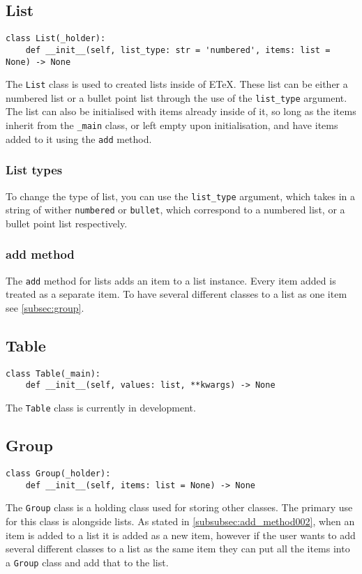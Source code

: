 \documentclass{article}
\begin{document}
\subsection{List}\label{subsec:list}
\begin{verbatim}
class List(_holder):
	def __init__(self, list_type: str = 'numbered', items: list = None) -> None
\end{verbatim}
The \verb|List| class is used to created lists inside of ETeX. These list can be either a numbered list or a bullet point list through the use of the \verb|list_type| argument. The list can also be initialised with items already inside of it, so long as the items inherit from the \verb|_main| class, or left empty upon initialisation, and have items added to it using the \verb|add| method.
\subsubsection{List types}\label{subsubsec:list_types}
To change the type of list, you can use the \verb|list_type| argument, which takes in a string of wither \verb|numbered| or \verb|bullet|, which correspond to a numbered list, or a bullet point list respectively.
\subsubsection{add method}\label{subsubsec:add_method002}
The \verb|add| method for lists adds an item to a list instance. Every item added is treated as a separate item. To have several different classes to a list as one item see \autoref{subsec:group}.
\subsection{Table}\label{subsec:table}
\begin{verbatim}
class Table(_main):
	def __init__(self, values: list, **kwargs) -> None
\end{verbatim}
The \verb|Table| class is currently in development.
\subsection{Group}\label{subsec:group}
\begin{verbatim}
class Group(_holder):
	def __init__(self, items: list = None) -> None
\end{verbatim}
The \verb|Group| class is a holding class used for storing other classes. The primary use for this class is alongside lists. As stated in \autoref{subsubsec:add_method002}, when an item is added to a list it is added as a new item, however if the user wants to add several different classes to a list as the same item they can put all the items into a \verb|Group| class and add that to the list.
\end{document}
